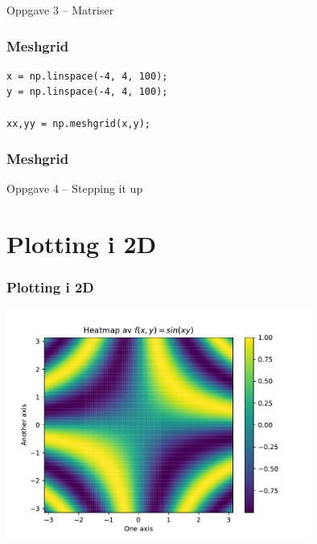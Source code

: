 \documentclass{beamer}
\begin{document}
\begin{frame}
  \begin{block}{Oppgave 3 -- Matriser}\end{block}
\end{frame}

\begin{frame}[fragile]
  \frametitle{Meshgrid}
  \begin{minipage}[b]{.55\textwidth}
  \begin{lstlisting}[title={Meshgrid}]
x = np.linspace(-4, 4, 100);
y = np.linspace(-4, 4, 100);

xx,yy = np.meshgrid(x,y);
  \end{lstlisting}
  \end{minipage}
  \begin{minipage}[b]{.3\textwidth}
  \end{minipage}
\end{frame}
\begin{frame}
  \frametitle{Meshgrid}
  \centering
\end{frame}

\begin{frame}
  \begin{block}{Oppgave 4 -- Stepping it up}\end{block}
\end{frame}

\section{Plotting i 2D}
\begin{frame}
  \frametitle{Plotting i 2D}
  \begin{center}
    \includegraphics[width=0.75\textwidth]{heatmap}
  \end{center}
\end{frame}
\end{document}
